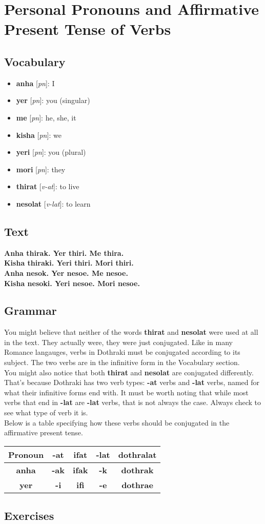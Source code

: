 \chapter{Personal Pronouns and Affirmative Present Tense of Verbs}
\section*{Vocabulary}
\begin{itemize}
	\item \textbf{anha} [\textit{pn}]: I
	\item \textbf{yer} [\textit{pn}]: you (singular)
	\item \textbf{me} [\textit{pn}]: he, she, it
	\item \textbf{kisha} [\textit{pn}]: we
	\item \textbf{yeri} [\textit{pn}]: you (plural)
	\item \textbf{mori} [\textit{pn}]: they
	\item \textbf{thirat} [\textit{v-at}]: to live
	\item \textbf{nesolat} [\textit{v-lat}]: to learn
\end{itemize}
\section*{Text}
	\textbf{Anha thirak. Yer thiri. Me thira.} \\
  \textbf{Kisha thiraki. Yeri thiri. Mori thiri.} \\
	\textbf{Anha nesok. Yer nesoe. Me nesoe.} \\
	\textbf{Kisha nesoki. Yeri nesoe. Mori nesoe.}
\section*{Grammar}
You might believe that neither of the words \textbf{thirat} and \textbf{nesolat}
were used at all in the text. They actually were, they were just conjugated.
Like in many Romance langauges, verbs in Dothraki must be conjugated according
to its subject. The two verbs are in the infinitive form in the Vocabulary section.\\
You might also notice that both \textbf{thirat} and \textbf{nesolat} are
conjugated differently. That's because Dothraki has two verb types: \textbf{-at}
verbs and \textbf{-lat} verbs, named for what their infinitive forms end with.
It must be worth noting that while most verbs that end in \textbf{-lat} are \textbf{-lat} verbs,
that is not always the case. Always check to see what type of verb it is.\\
Below is a table specifying how these verbs should be conjugated in the affirmative present tense. \\
\begin{tabular}{|c|c|c|c|c|}
		\hline
		Pronoun & \textbf{-at} & \textbf{ifat} & \textbf{-lat} & \textbf{dothralat} \\
		\hline
		\textbf{anha} & \textbf{-ak} & \textbf{ifak} & \textbf{-k} & \textbf{dothrak} \\
		\hline
		\textbf{yer} & \textbf{-i} & \textbf{ifi} & \textbf{-e} & \textbf{dothrae} \\
		\hline
\end{tabular}
\section*{Exercises}
